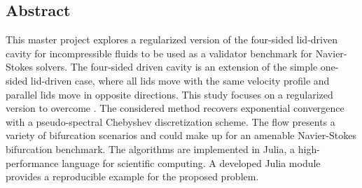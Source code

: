 
\begin{center}
\section*{Abstract}
\end{center} 

This master project explores a regularized version of the four-sided lid-driven
cavity for incompressible fluids to be used as a validator benchmark for
Navier-Stokes solvers. The four-sided driven cavity is an extension of the
simple one-sided lid-driven case, where all lids move with the same velocity
profile and parallel lids move in opposite directions. This study focuses on a
regularized version to overcome . The considered
method recovers exponential convergence with a pseudo-spectral Chebyshev
discretization scheme. The flow presents a variety of bifurcation scenarios and
could make up for an amenable Navier-Stokes bifurcation benchmark. The
algorithms are implemented in Julia, a high-performance language for scientific
computing. A developed Julia module provides a reproducible example for the
proposed problem.
